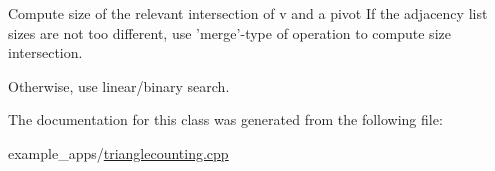 Compute size of the relevant intersection of v and a pivot If the adjacency list sizes are not too different, use 'merge'-\/type of operation to compute size intersection.

\begin{DoxyVerb}                Otherwise, use linear/binary search.\end{DoxyVerb}


The documentation for this class was generated from the following file\-:\begin{DoxyCompactItemize}
\item 
example\-\_\-apps/\hyperlink{trianglecounting_8cpp}{trianglecounting.\-cpp}\end{DoxyCompactItemize}
